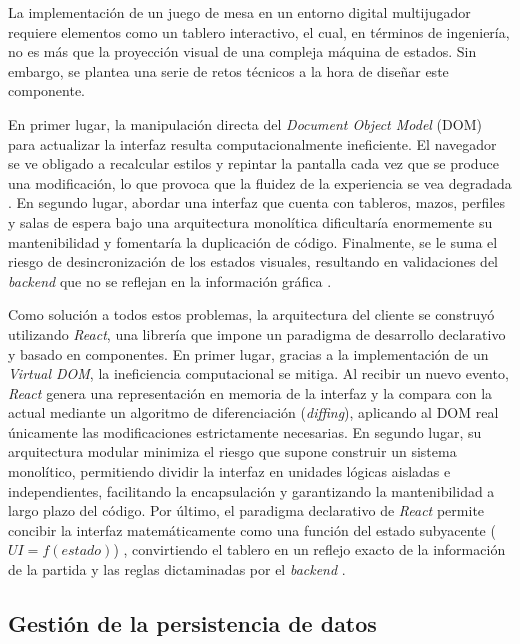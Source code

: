 La implementación de un juego de mesa en un entorno digital multijugador requiere elementos como un tablero interactivo, el cual, en términos de ingeniería, no es más que la proyección visual de una compleja máquina de estados. Sin embargo, se plantea una serie de retos técnicos a la hora de diseñar este componente. 

En primer lugar, la manipulación directa del \textit{Document Object Model} (DOM) para actualizar la interfaz resulta computacionalmente ineficiente. El navegador se ve obligado a recalcular estilos y repintar la pantalla cada vez que se produce una modificación, lo que provoca que la fluidez de la experiencia se vea degradada \cite{mardan_react}. En segundo lugar, abordar una interfaz que cuenta con tableros, mazos, perfiles y salas de espera bajo una arquitectura monolítica dificultaría enormemente su mantenibilidad y fomentaría la duplicación de código. Finalmente, se le suma el riesgo de desincronización de los estados visuales, resultando en validaciones del \textit{backend} que no se reflejan en la información gráfica \cite{banks_react}.  

Como solución a todos estos problemas, la arquitectura del cliente se construyó utilizando \textit{React}, una librería que impone un paradigma de desarrollo declarativo y basado en componentes. En primer lugar, gracias a la implementación de un \textit{Virtual DOM}, la ineficiencia computacional se mitiga. Al recibir un nuevo evento, \textit{React} genera una representación en memoria de la interfaz y la compara con la actual mediante un algoritmo de diferenciación (\textit{diffing}), aplicando al DOM real únicamente las modificaciones estrictamente necesarias. En segundo lugar, su arquitectura modular minimiza el riesgo que supone construir un sistema monolítico, permitiendo dividir la interfaz en unidades lógicas aisladas e independientes, facilitando la encapsulación y garantizando la mantenibilidad a largo plazo del código. Por último, el paradigma declarativo de \textit{React} permite concibir la interfaz matemáticamente como una función del estado subyacente ($UI = f(estado)$) \cite{banks_react}, convirtiendo el tablero en un reflejo exacto de la información de la partida y las reglas dictaminadas por el \textit{backend} \cite{mardan_react}.

\subsection{Gestión de la persistencia de datos}

